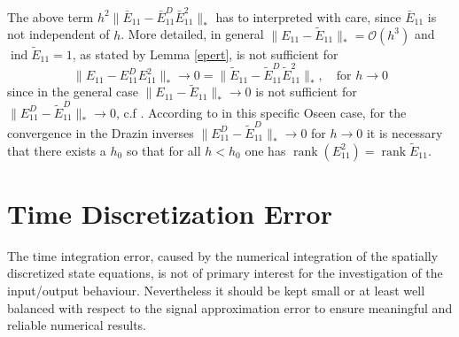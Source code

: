 \documentclass[a4paper,10pt,BCOR=15mm]{scrbook}
\DeclareMathOperator{\ind}{ind}
\DeclareMathOperator{\rank}{rank}
\providecommand{\norm}[1]{\lVert#1 \rVert}
\begin{document}
\begin{rem}
 The above term $h^2 \norm{\bar E_{11} -\bar E_{11}^D\bar E_{11}^2}_*$ has to interpreted with care, since $\bar E_{11}$ is not independent of $h$. More detailed, in general $\norm {E_{11} - \tilde E_{11}}_* = \mathcal O(h^3)$ and $\ind \tilde E_{11} =1$, as stated by Lemma \ref{epert}, is not sufficient for 
\begin{equation*}
 \norm{ E_{11} - E_{11}^D E_{11}^2}_* \rightarrow 0 = \norm{\tilde E_{11} -\tilde E_{11}^D\tilde E_{11}^2}_*, \quad \text{for  } h \rightarrow 0
\end{equation*}
since in the general case $ \norm{E_{11}-\tilde E_{11}}_* \rightarrow 0$ is not sufficient for $ \norm{E_{11}^D-\tilde E_{11}^D}_* \rightarrow 0$, c.f \cite{wewu}. According to \cite{came} in this specific Oseen case, for the convergence in the Drazin inverses $ \norm{E_{11}^D-\tilde E_{11}^D}_* \rightarrow 0$ for $h\rightarrow 0$ it is necessary that there exists a $h_0$ so that for all $h<h_0$ one has $\rank (E_{11}^2) = \rank \tilde E_{11}$.

\end{rem}


\section{Time Discretization Error}\label{tde}
The time integration error, caused by the numerical integration of the spatially discretized state equations, is not of primary interest for the investigation of the input/output behaviour. Nevertheless it should be kept small or at least well balanced with respect to the signal approximation error to ensure meaningful and reliable numerical results.
\end{document}
